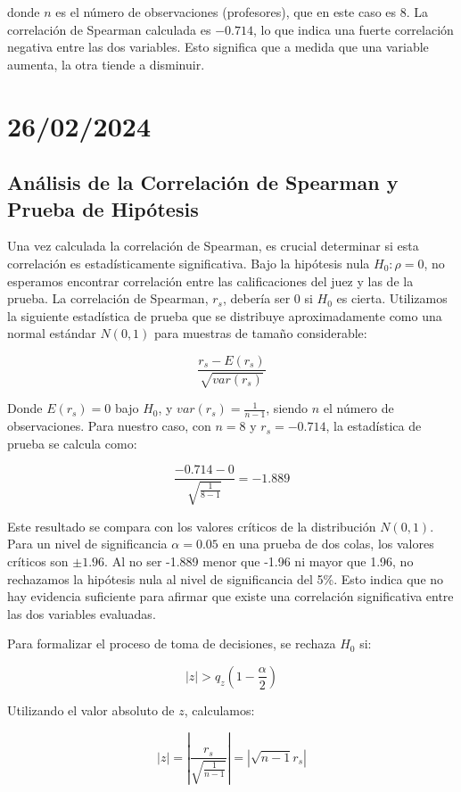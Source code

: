 \documentclass{article}
\begin{document}
donde $n$ es el número de observaciones (profesores), que en este caso es 8. La correlación de Spearman calculada es $-0.714$, lo que indica una fuerte correlación negativa entre las dos variables. Esto significa que a medida que una variable aumenta, la otra tiende a disminuir.

\section{26/02/2024}
\subsection*{Análisis de la Correlación de Spearman y Prueba de Hipótesis}

Una vez calculada la correlación de Spearman, es crucial determinar si esta correlación es estadísticamente significativa. Bajo la hipótesis nula \(H_0: \rho = 0\), no esperamos encontrar correlación entre las calificaciones del juez y las de la prueba. La correlación de Spearman, \(r_s\), debería ser 0 si \(H_0\) es cierta. Utilizamos la siguiente estadística de prueba que se distribuye aproximadamente como una normal estándar \(N(0,1)\) para muestras de tamaño considerable:

\[
    \frac{r_s - E(r_s)}{\sqrt{var(r_s)}}
\]

Donde \(E(r_s) = 0\) bajo \(H_0\), y \(var(r_s) = \frac{1}{n-1}\), siendo \(n\) el número de observaciones. Para nuestro caso, con \(n = 8\) y \(r_s = -0.714\), la estadística de prueba se calcula como:

\[
    \frac{-0.714 - 0}{\sqrt{\frac{1}{8-1}}} = -1.889
\]

Este resultado se compara con los valores críticos de la distribución \(N(0,1)\). Para un nivel de significancia \(\alpha = 0.05\) en una prueba de dos colas, los valores críticos son \(\pm 1.96\). Al no ser -1.889 menor que -1.96 ni mayor que 1.96, no rechazamos la hipótesis nula al nivel de significancia del 5\%. Esto indica que no hay evidencia suficiente para afirmar que existe una correlación significativa entre las dos variables evaluadas.

Para formalizar el proceso de toma de decisiones, se rechaza \(H_0\) si:

\[
    |z| > q_z(1-\frac{\alpha}{2})
\]

Utilizando el valor absoluto de \(z\), calculamos:

\[
    |z| = |\frac{r_s}{\sqrt{\frac{1}{n-1}}}| = |\sqrt{n-1}r_s|
\]
\end{document}
